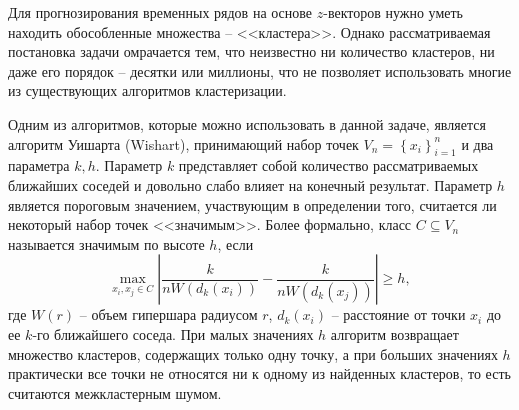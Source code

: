 
Для прогнозирования временных рядов на основе $z$-векторов нужно уметь находить обособленные множества -- <<кластера>>.
Однако рассматриваемая постановка задачи омрачается тем, что неизвестно ни количество кластеров, ни даже его порядок -- десятки или миллионы, что не позволяет использовать многие из существующих алгоритмов кластеризации.


Одним из алгоритмов, которые можно использовать в данной задаче, является алгоритм Уишарта (Wishart), принимающий набор точек $V_n = \left\{ x_i \right\}_{i=1}^{n}$ и два параметра $k, h$.
Параметр $k$ представляет собой количество рассматриваемых ближайших соседей и довольно слабо влияет на конечный результат.
Параметр $h$ является пороговым значением, участвующим в определении того, считается ли некоторый набор точек <<значимым>>.
Более формально, класс $C \subseteq V_n$ называется значимым по высоте $h$, если
\begin{equation*}
    \max_{x_i, x_j \in C}
    \left| \frac{k}{n W(d_k(x_i))} - \frac{k}{n W(d_k(x_j))} \right| \geq h,
\end{equation*}
где $W(r)$ -- объем гипершара радиусом $r$, $d_k(x_i)$ -- расстояние от точки $x_i$ до ее $k$-го ближайшего соседа.
При малых значениях $h$ алгоритм возвращает множество кластеров, содержащих только одну точку, а при больших значениях $h$ практически все точки не относятся ни к одному из найденных кластеров, то есть считаются межкластерным шумом.

